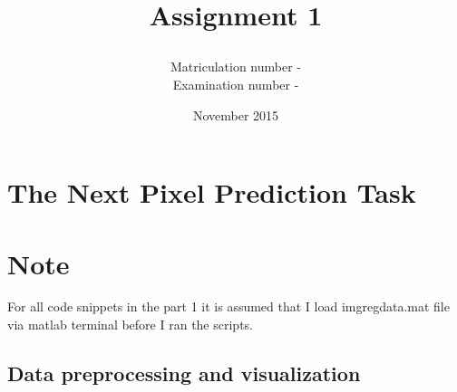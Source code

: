 \documentclass{article}
\title{\subject\\Assignment 1}
\date{November 2015}
\author{Matriculation number - \matricno\\Examination number - \exmno}
\begin{document}
\maketitle
	\section{The Next Pixel Prediction Task}
		\section*{Note} 
			 For all code snippets in the part 1 it is assumed that I load imgregdata.mat file via matlab terminal before I ran the scripts.
		\subsection{Data preprocessing and visualization}
\end{document}
